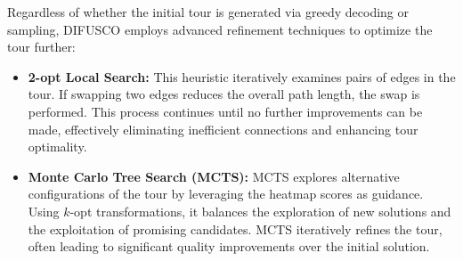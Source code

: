 Regardless of whether the initial tour is generated via greedy decoding or sampling, DIFUSCO employs advanced refinement techniques to optimize the tour further:
\begin{itemize}
    \item \textbf{2-opt Local Search:} This heuristic iteratively examines pairs of edges in the tour. If swapping two edges reduces the overall path length, the swap is performed. This process continues until no further improvements can be made, effectively eliminating inefficient connections and enhancing tour optimality.
    \item \textbf{Monte Carlo Tree Search (MCTS):} MCTS explores alternative configurations of the tour by leveraging the heatmap scores as guidance. Using \(k\)-opt transformations, it balances the exploration of new solutions and the exploitation of promising candidates. MCTS iteratively refines the tour, often leading to significant quality improvements over the initial solution.
\end{itemize}




